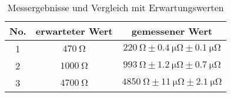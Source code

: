 \begin{table}[H]
  \centering
  \caption{Messergebnisse und Vergleich mit Erwartungswerten}

  \begin{tabular}{|c|c|c|}
    No. & erwarteter Wert & gemessener Wert  \\
    \hline
    1  & $\SI{470}{\ohm}$ & $ \SI{220}{\ohm} \pm \SI{0.4}{\micro \ohm} \pm \SI{0.1}{\micro \ohm}$  \\
    2  & $\SI{1000}{\ohm}$ & $\SI{993}{\ohm} \pm \SI{1.2}{\micro \ohm} \pm \SI{0.7}{\micro \ohm}$  \\
    3  & $\SI{4700}{\ohm}$ & $\SI{4850}{\ohm} \pm \SI{11}{\micro \ohm} \pm \SI{2.1}{\micro \ohm}$   \\
  \end{tabular}
\end{table}
